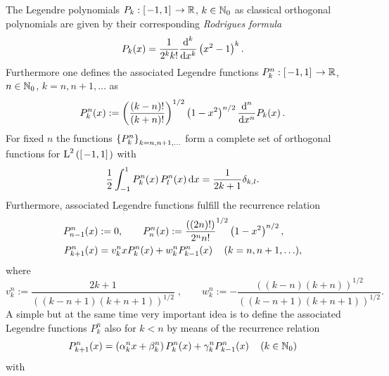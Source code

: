 The Legendre polynomials $P_k : \left[\left.-1,1\right]\right. \rightarrow \mathbb{R}$, $k \in \mathbb{N}_{0}$ 
as classical orthogonal polynomials are given by their corresponding 
\emph{Rodrigues formula}
\begin{equation}
  \nonumber
  P_k{\hspace{-0.4ex}}\left(x\right) = \frac{1}{2^k k!} \frac{\text{\rm{d}}^k}{\text{\rm{d}} x^k} \left(x^2-1\right)^k.
\end{equation}
Furthermore one defines the associated Legendre functions $P_k^n : \left[\left.-1,1\right]\right. \rightarrow \mathbb{R}$, 
$n \in \mathbb{N}_{0}$, $k=n,n+1,\ldots$ as 
\begin{equation}
  \nonumber
  P_k^n{\hspace{-0.4ex}}\left(x\right) := \left(\frac{\left(k-n\right)!}{\left(k+n\right)!}\right)^{1/2}
  \left(1-x^2\right)^{n/2} \frac{\text{\rm{d}}^n}{\text{\rm{d}} x^n} P_k{\hspace{-0.4ex}}\left(x\right).
\end{equation}
For fixed $n$ the functions $\left\{P_{k}^n\right\rbrace_{k=n,n+1,\ldots}$ form a complete set of orthogonal functions 
for $\text{\rm{L}}^{2}\left(\left[\left.-1,1\right]\right.\right)$ with
$$ \frac{1}{2} \int_{-1}^{1} P_{k}^n{\hspace{-0.4ex}}\left(x\right) P_{l}^n{\hspace{-0.4ex}}\left(x\right) \text{\rm{d}} x = \frac{1}{2k+1} \delta_{k,l}.$$
Furthermore, associated Legendre functions fulfill the recurrence relation
\begin{equation}
  \label{Basics:AssociatedLegendreDefinition}
  \begin{split}
    P_{n-1}^n{\hspace{-0.4ex}}\left(x\right) & := 0,\qquad P_{n}^n{\hspace{-0.4ex}}\left(x\right) := \frac{((2n)!)}{2^n n!}^{1/2} \left(1-x^2\right)^{n/2},\\
    P_{k+1}^n{\hspace{-0.4ex}}\left(x\right) & = v_{k}^n x P_{k}^n{\hspace{-0.4ex}}\left(x\right) + w_{k}^n P_{k-1}^n{\hspace{-0.4ex}}\left(x\right) \quad (k = n,n+1,\ldots),
  \end{split}
\end{equation}
where
\begin{equation} 
  \label{Basics:AssociatedLegendreRecurrenceCoefficients}
v_{k}^n := \frac{2k+1}{((k-n+1)(k+n+1))^{1/2}}\; ,\qquad w_{k}^n := - \frac{((k-n)(k+n))^{1/2}}{((k-n+1)(k+n+1))^{1/2}}.
\end{equation}
A simple but at the same time very important idea is to define the associated Legendre functions $P_k^n$ also for 
$k < n$ by means of the recurrence relation
$$ P_{k+1}^n{\hspace{-0.4ex}}\left(x\right) = \left(\alpha_{k}^n x + \beta_{k}^n\right) P_{k}^n{\hspace{-0.4ex}}\left(x\right) + \gamma_{k}^n P_{k-1}^n{\hspace{-0.4ex}}\left(x\right)\quad\left(k \in \mathbb{N}_{0}\right)$$
with
